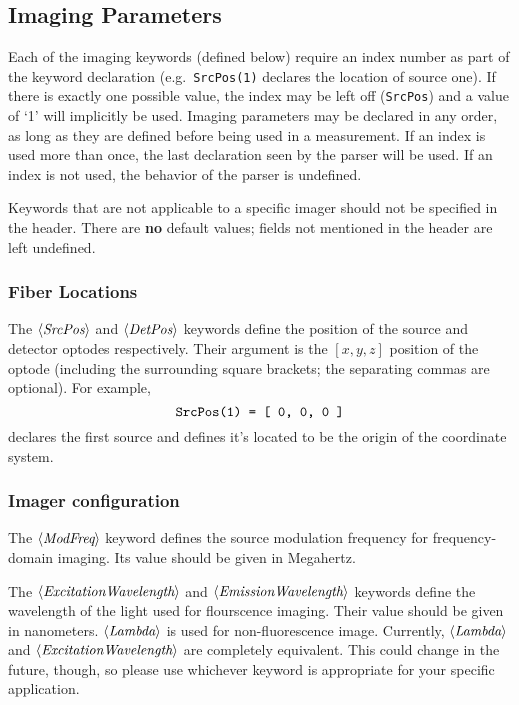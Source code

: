 \documentclass[12pt]{article}
\newcommand{\keyword}[1]{\mbox{$\left<\mbox{\it #1}\right>$}\/}
\begin{document}

\subsection{Imaging Parameters}
\label{sub:imgparam}

Each of the imaging keywords (defined below) require an index number
as part of the keyword declaration (e.g.\ {\tt SrcPos(1)} declares the
location of source one).  If there is exactly one possible value, the
index may be left off ({\tt SrcPos}) and a value of `1' will
implicitly be used.  Imaging parameters may be declared in any order,
as long as they are defined before being used in a measurement.  If an
index is used more than once, the last declaration seen by the parser
will be used.  If an index is not used, the behavior of the parser is
undefined.

Keywords that are not applicable to a specific imager should not be
specified in the header.  There are {\bf no} default values; fields
not mentioned in the header are left undefined.

\subsubsection{Fiber Locations}

The \keyword{SrcPos} and \keyword{DetPos} keywords define the position
of the source and detector optodes respectively.  Their argument is
the $\left[x,y,z\right]$ position of the optode (including the
surrounding square brackets; the separating commas are optional).  For
example,
\[
\mbox{\tt SrcPos(1) = [ 0, 0, 0 ]} 
\]
declares the first source and defines it's located to be the origin of
the coordinate system.

\subsubsection{Imager configuration}

The \keyword{ModFreq} keyword defines the source modulation frequency for
frequency-domain imaging.  Its value should be given in Megahertz.

The \keyword{ExcitationWavelength} and \keyword{EmissionWavelength}
keywords define the wavelength of the light used for flourscence imaging.
Their value should be given in nano\-meters.  \keyword{Lambda} is used
for non-fluorescence image.  Currently, \keyword{Lambda} and
\keyword{ExcitationWavelength} are completely equivalent.  This could
change in the future, though, so please use whichever keyword is
appropriate for your specific application.
\end{document}
